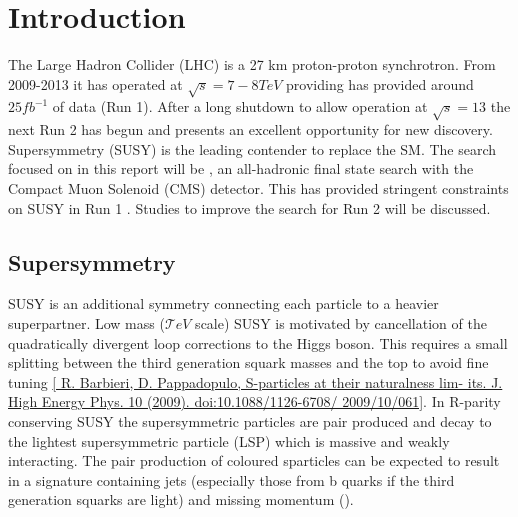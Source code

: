 
\chapter{Introduction} %

\label{Chapter1} %


The Large Hadron Collider (LHC) is a 27 km proton-proton synchrotron. 
From 2009-2013 it has operated at $\sqrt{s}=7-8TeV$ providing has provided around $25fb^{-1}$ of data (Run 1). After a long shutdown to allow operation at $\sqrt{s}=13$ the next Run 2 has begun and presents an excellent opportunity for new discovery. 
Supersymmetry (SUSY) is the leading contender to replace the SM. The search focused on in this report will be \alphat, 
an all-hadronic final state search with the Compact Muon Solenoid (CMS) detector. 
This has  provided stringent constraints on SUSY in Run 1 \cite{search}. Studies to improve the search for Run 2 will be discussed.

\section {Supersymmetry}
SUSY is an additional symmetry connecting each particle to a heavier superpartner. 
Low mass ($\mathcal TeV$ scale) SUSY is motivated by cancellation of the quadratically divergent loop corrections to the Higgs boson. 
This requires a small splitting between the third generation squark masses and the top to avoid fine tuning 
\ref{ R. Barbieri, D. Pappadopulo, S-particles at their naturalness lim- its. J. High Energy Phys. 10 (2009). doi:10.1088/1126-6708/ 2009/10/061}. 
In R-parity conserving SUSY \cite{susywimp} the supersymmetric particles are pair produced and 
decay to the lightest supersymmetric particle (LSP) which is massive and weakly interacting. 
The pair production of coloured sparticles can be expected to result in a signature containing jets
(especially those from b quarks if the third generation squarks are light) and missing momentum (\met).

